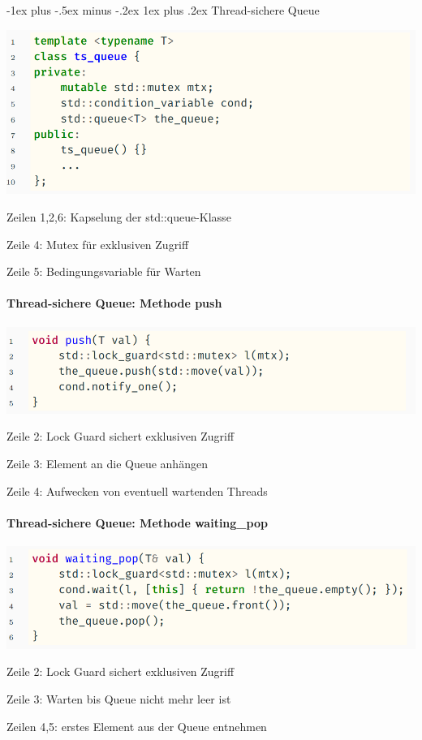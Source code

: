 \documentclass[10pt]{article}
\makeatletter
\renewcommand{\subsubsection}{\@startsection{subsubsection}{3}{0mm}%
                                {-1ex plus -.5ex minus -.2ex}%
                                {1ex plus .2ex}%
                                {\normalfont\small\bfseries}}
\makeatother
\begin{document}
  \subsubsection{Thread-sichere Queue}
  \begin{center}
    \includegraphics[width=0.4\linewidth]{Assets/Programmierparadigmen-code-snippet-37}
  \end{center}
  \begin{itemize*}
    \item Zeilen 1,2,6: Kapselung der std::queue-Klasse
    \item Zeile 4: Mutex für exklusiven Zugriff
    \item Zeile 5: Bedingungsvariable für Warten
  \end{itemize*}
  
  \paragraph{Thread-sichere Queue: Methode push}
  
  \begin{center}
    \includegraphics[width=0.4\linewidth]{Assets/Programmierparadigmen-code-snippet-38}
  \end{center}
  \begin{itemize*}
    \item Zeile 2: Lock Guard sichert exklusiven Zugriff
    \item Zeile 3: Element an die Queue anhängen
    \item Zeile 4: Aufwecken von eventuell wartenden Threads
  \end{itemize*}
  
  \paragraph{Thread-sichere Queue: Methode waiting\_pop}
  
  \begin{center}
    \includegraphics[width=0.4\linewidth]{Assets/Programmierparadigmen-code-snippet-39}
  \end{center}
  \begin{itemize*}
    \item Zeile 2: Lock Guard sichert exklusiven Zugriff
    \item Zeile 3: Warten bis Queue nicht mehr leer ist
    \item Zeilen 4,5: erstes Element aus der Queue entnehmen
  \end{itemize*}
  
\end{document}
